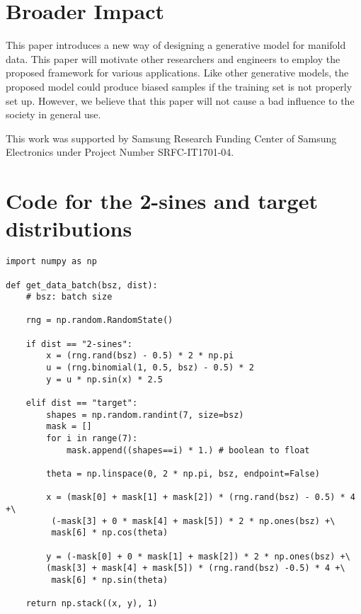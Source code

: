 \documentclass{article}
\begin{document}
\section*{Broader Impact}
This paper introduces a new way of designing a generative model for manifold data. This paper will motivate other researchers and engineers to employ the proposed framework for various applications. Like other generative models, the proposed model could produce biased samples if the training set is not properly set up. However, we believe that this paper will not cause a bad influence to the society in general use.


\begin{ack}
This work was supported by Samsung Research Funding Center of Samsung Electronics under Project Number SRFC-IT1701-04.
\end{ack}










\newpage

\appendix


\section{Code for the 2-sines and target distributions}
\label{appendix:a}

\begin{lstlisting}
import numpy as np

def get_data_batch(bsz, dist):
    # bsz: batch size
    
    rng = np.random.RandomState()
    
    if dist == "2-sines": 
        x = (rng.rand(bsz) - 0.5) * 2 * np.pi
        u = (rng.binomial(1, 0.5, bsz) - 0.5) * 2
        y = u * np.sin(x) * 2.5
        
    elif dist == "target":
        shapes = np.random.randint(7, size=bsz)
        mask = []
        for i in range(7):
            mask.append((shapes==i) * 1.) # boolean to float
            
        theta = np.linspace(0, 2 * np.pi, bsz, endpoint=False)

        x = (mask[0] + mask[1] + mask[2]) * (rng.rand(bsz) - 0.5) * 4 +\
         (-mask[3] + 0 * mask[4] + mask[5]) * 2 * np.ones(bsz) +\
         mask[6] * np.cos(theta)

        y = (-mask[0] + 0 * mask[1] + mask[2]) * 2 * np.ones(bsz) +\
        (mask[3] + mask[4] + mask[5]) * (rng.rand(bsz) -0.5) * 4 +\
         mask[6] * np.sin(theta)
        
    return np.stack((x, y), 1)
\end{lstlisting}
\end{document}
